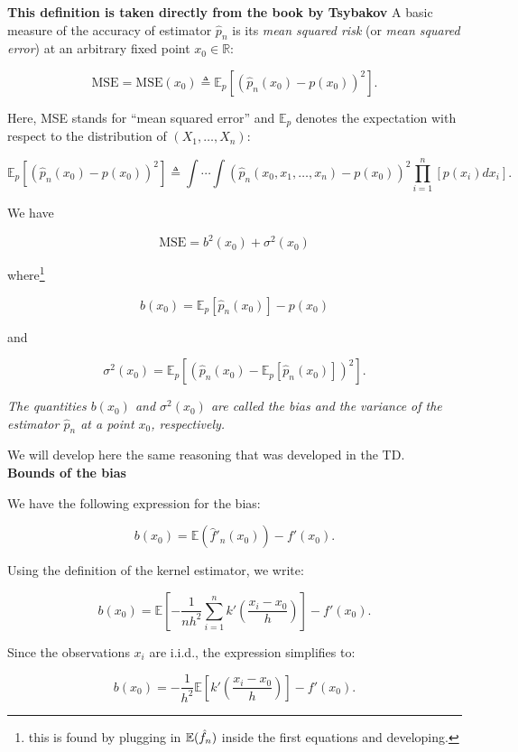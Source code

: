 \documentclass{article}
\begin{document}
\textbf{This definition is taken directly from the book by Tsybakov}
A basic measure of the accuracy of estimator $\hat{p}_n$ is its \textit{mean squared risk} (or \textit{mean squared error}) at an arbitrary fixed point $x_0 \in \mathbb{R}$:

\[
\text{MSE} = \text{MSE}(x_0) \triangleq \mathbb{E}_p \left[ \left( \hat{p}_n(x_0) - p(x_0) \right)^2 \right].
\]

Here, MSE stands for “mean squared error” and $\mathbb{E}_p$ denotes the expectation with respect to the distribution of $(X_1, \dots, X_n)$:

\[
\mathbb{E}_p \left[ \left( \hat{p}_n(x_0) - p(x_0) \right)^2 \right] \triangleq \int \cdots \int \left( \hat{p}_n(x_0, x_1, \dots, x_n) - p(x_0) \right)^2 \prod_{i=1}^n \left[ p(x_i) dx_i \right].
\]

We have 

\[
\text{MSE} = b^2(x_0) + \sigma^2(x_0)
\tag{1.4}
\]

where\footnote{this is found by plugging in \(\mathbb{E}(\hat{f}_n)\) inside the first equations and developing.}

\[
b(x_0) = \mathbb{E}_p[\hat{p}_n(x_0)] - p(x_0)
\]

and 

\[
\sigma^2(x_0) = \mathbb{E}_p \left[ \left( \hat{p}_n(x_0) - \mathbb{E}_p[\hat{p}_n(x_0)] \right)^2 \right].
\]

\begin{definition}
    \textit{The quantities $b(x_0)$ and $\sigma^2(x_0)$ are called the bias and the variance of the estimator $\hat{p}_n$ at a point $x_0$, respectively.}

\end{definition}

We will develop here the same reasoning that was developed in the TD. \\

\textbf{Bounds of the bias}

We have the following expression for the bias:

\[
b(x_0) = \mathbb{E}\left(\hat{f}'_n(x_0)\right) - f'(x_0).
\]

Using the definition of the kernel estimator, we write:

\[
b(x_0) = \mathbb{E}\left[-\frac{1}{n h^2} \sum_{i=1}^n k'\left(\frac{x_i - x_0}{h}\right)\right] - f'(x_0).
\]

Since the observations \( x_i \) are i.i.d., the expression simplifies to:

\[
b(x_0) = -\frac{1}{h^2} \mathbb{E}\left[k'\left(\frac{x_i - x_0}{h}\right)\right] - f'(x_0).
\]
\end{document}
